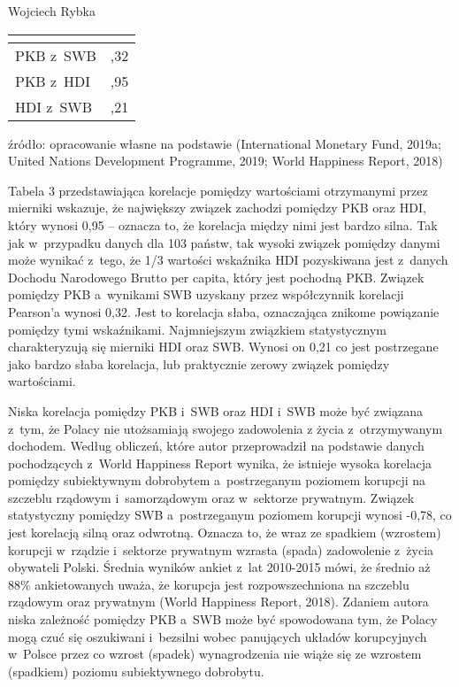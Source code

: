 \begin{artplenv}{Wojciech Rybka}
\begin{center}
\tablefirsthead{}
\tablehead{}
\tabletail{}
\tablelasttail{}
\begin{supertabular}{|m{4.552cm}|m{4.55cm}|}
\hline
{}\\\hline
\centering PKB z~SWB &
\centering{},32\\\hline
\centering PKB z~HDI &
\centering{},95\\\hline
\centering HDI z~SWB &
\centering{},21\\\hline
\end{supertabular}
\end{center}
źródło: opracowanie własne na podstawie \label{ref:RNDJaFcYZDBCr}(International Monetary Fund, 2019a; United Nations
Development Programme, 2019; World Happiness Report, 2018)

Tabela 3 przedstawiająca korelacje pomiędzy wartościami otrzymanymi przez mierniki wskazuje, że największy związek
zachodzi pomiędzy PKB oraz HDI, który wynosi 0,95 -- oznacza to, że korelacja między nimi jest bardzo silna. Tak
jak w~przypadku danych dla 103 państw, tak wysoki związek pomiędzy danymi może wynikać z~tego, że 1/3 wartości wskaźnika HDI
pozyskiwana jest z~danych Dochodu Narodowego Brutto per capita, który jest pochodną PKB. Związek pomiędzy
PKB a~wynikami SWB uzyskany przez współczynnik korelacji Pearson’a wynosi 0,32. Jest to korelacja słaba, oznaczająca znikome
powiązanie pomiędzy tymi wskaźnikami. Najmniejszym związkiem statystycznym charakteryzują się mierniki HDI oraz SWB.
Wynosi on 0,21 co jest postrzegane jako bardzo słaba korelacja, lub praktycznie zerowy związek pomiędzy wartościami. 

Niska korelacja pomiędzy PKB i~SWB oraz HDI i~SWB może być związana z~tym, że Polacy nie utożsamiają swojego zadowolenia
z życia z~otrzymywanym dochodem. Według obliczeń, które autor przeprowadził na podstawie danych pochodzących z~World
Happiness Report wynika, że istnieje wysoka korelacja pomiędzy subiektywnym dobrobytem a~postrzeganym poziomem korupcji
na szczeblu rządowym i~samorządowym oraz w~sektorze prywatnym. Związek statystyczny pomiędzy SWB a~postrzeganym
poziomem korupcji wynosi -0,78, co jest korelacją silną oraz odwrotną. Oznacza to, że wraz ze spadkiem (wzrostem)
korupcji w~rządzie i~sektorze prywatnym wzrasta (spada) zadowolenie z~życia obywateli Polski. Średnia wyników
ankiet z~lat 2010-2015 mówi, że średnio aż 88\% ankietowanych uważa, że korupcja jest rozpowszechniona na szczeblu rządowym oraz
prywatnym \label{ref:RNDcRU0ppjN4H}(World Happiness Report, 2018). Zdaniem autora niska zależność pomiędzy PKB a~SWB
może być spowodowana tym, że Polacy mogą czuć się oszukiwani i~bezsilni wobec panujących układów korupcyjnych w~Polsce
przez co wzrost (spadek) wynagrodzenia nie wiąże się ze wzrostem (spadkiem) poziomu subiektywnego dobrobytu.


\end{artplenv}
